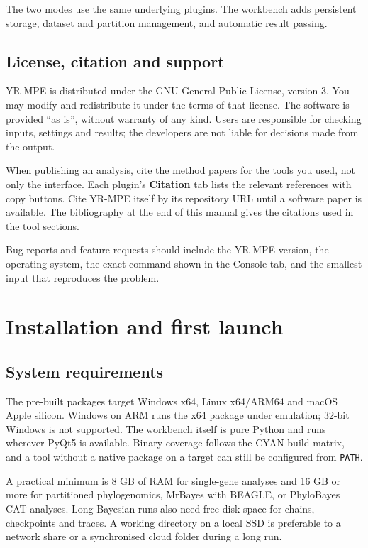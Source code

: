 \documentclass[10pt]{report}
\begin{document}
The two modes use the same underlying plugins. The workbench adds persistent
storage, dataset and partition management, and automatic result passing.

\section{License, citation and support}

YR-MPE is distributed under the GNU General Public License, version 3. You may
modify and redistribute it under the terms of that license. The software is
provided ``as is'', without warranty of any kind. Users are responsible for
checking inputs, settings and results; the developers are not liable for
decisions made from the output.

When publishing an analysis, cite the method papers for the tools you used, not
only the interface. Each plugin's \textbf{Citation} tab lists the relevant
references with copy buttons. Cite YR-MPE itself by its repository URL until a
software paper is available. The bibliography at the end of this manual gives
the citations used in the tool sections.

Bug reports and feature requests should include the YR-MPE version, the
operating system, the exact command shown in the Console tab, and the smallest
input that reproduces the problem.

\chapter{Installation and first launch}

\section{System requirements}

The pre-built packages target Windows x64, Linux x64/ARM64 and macOS Apple
silicon. Windows on ARM runs the x64 package under emulation; 32-bit Windows
is not supported. The workbench itself is pure Python and runs wherever
PyQt5 is available. Binary coverage follows the CYAN build matrix, and a tool
without a native package on a target can still be configured from \texttt{PATH}.

A practical minimum is 8 GB of RAM for single-gene analyses and 16 GB or more
for partitioned phylogenomics, MrBayes with BEAGLE, or PhyloBayes CAT analyses.
Long Bayesian runs also need free disk space for chains, checkpoints and
traces. A working directory on a local SSD is preferable to a network share or
a synchronised cloud folder during a long run.
\end{document}
